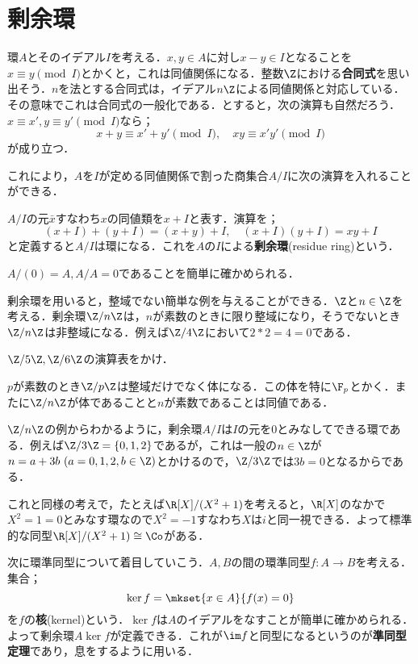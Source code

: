 \section{剰余環}

環$A$とそのイデアル$I$を考える．$x,y\in A$に対し$x-y\in I$となることを$x\equiv y \pmod I$とかくと，これは同値関係になる．整数$\Z$における\textbf{合同式}を思い出そう．$n$を法とする合同式は，イデアル$n\Z$による同値関係と対応している．その意味でこれは合同式の一般化である．とすると，次の演算も自然だろう．$x\equiv x',y\equiv y'\pmod I$なら；
\[x+y\equiv x'+y'\pmod I,\quad xy\equiv x'y'\pmod I\]
が成り立つ．

これにより，$A$を$I$が定める同値関係で割った商集合$A/I$に次の演算を入れることができる．

\begin{defi}[剰余環]
	$A/I$の元$\bar{x}$すなわち$x$の同値類を$x+I$と表す．演算を；
	\[(x+I)+(y+I)=(x+y)+I,\quad (x+I)(y+I)=xy+I\]
	と定義すると$A/I$は環になる．これを$A$の$I$による\textbf{剰余環}(residue ring)という．
\end{defi}

$A/(0)=A, A/A=0$であることを簡単に確かめられる．

剰余環を用いると，整域でない簡単な例を与えることができる．$\Z$と$n\in\Z$を考える．剰余環$\Z/n\Z$は，$n$が素数のときに限り整域になり，そうでないとき$\Z/n\Z$は非整域になる．例えば$\Z/4\Z$において$2*2=4=0$である．

\begin{exer}
	$\Z/5\Z,\Z/6\Z$の演算表をかけ．
\end{exer}

$p$が素数のとき$\Z/p\Z$は整域だけでなく体になる．この体を特に$\F_p$とかく．またに$\Z/n\Z$が体であることと$n$が素数であることは同値である．

$\Z/n\Z$の例からわかるように，剰余環$A/I$は$I$の元を0とみなしてできる環である．例えば$\Z/3\Z=\{0,1,2\}$であるが，これは一般の$n\in\Z$が$n=a+3b~(a=0,1,2, b\in\Z)$とかけるので，$\Z/3\Z$では$3b=0$となるからである．

これと同様の考えで，たとえば$\R[X]/(X^2+1)$を考えると，$\R[X]$のなかで$X^2=1=0$とみなす環なので$X^2=-1$すなわち$X$は$i$と同一視できる．よって標準的な同型$\R[X]/(X^2+1)\cong\Co$がある．

次に環準同型について着目していこう．$A,B$の間の環準同型$f:A\to B$を考える．集合；
\[\ker f=\mkset{x\in A}{f(x)=0}\]
を$f$の\textbf{核}(kernel)という．$\ker f$は$A$のイデアルをなすことが簡単に確かめられる．よって剰余環$A\ker f$が定義できる．これが$\im f$と同型になるというのが\textbf{準同型定理}であり，息をするように用いる．

